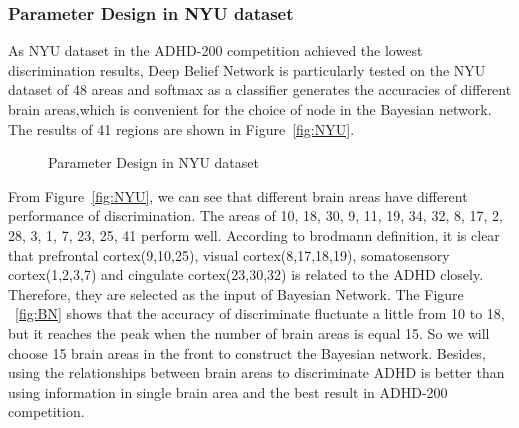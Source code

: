 \documentclass{article}
\begin{document}
\subsubsection{Parameter Design in NYU dataset}
As NYU dataset in the ADHD-200 competition achieved the lowest discrimination results, Deep Belief Network is particularly tested on the NYU dataset of 48 areas and softmax as a classifier generates the accuracies of different brain areas,which is convenient for the choice of node in the Bayesian network. The results of 41 regions are shown in Figure~\ref{fig:NYU}.
\begin{figure}[ht]
\begin{center}
   \caption{Parameter Design in NYU dataset}
\end{center}
\end{figure}


From Figure~\ref{fig:NYU}, we can see that different brain areas have different performance of discrimination. The areas of 10, 18, 30, 9, 11, 19, 34, 32, 8, 17, 2, 28, 3, 1, 7, 23, 25, 41 perform well. According to brodmann definition, it is clear that prefrontal cortex(9,10,25), visual cortex(8,17,18,19), somatosensory cortex(1,2,3,7) and cingulate cortex(23,30,32) is related to the ADHD closely. Therefore, they are selected as the input of Bayesian Network.  The Figure ~\ref{fig:BN} shows that the accuracy of discriminate fluctuate a little from 10 to 18, but it reaches the peak when the number of brain areas is equal 15. So we will choose 15 brain areas in the front to construct the Bayesian network. Besides, using the relationships between brain areas to discriminate ADHD is better than using information in single brain area and the best result in  ADHD-200 competition.
\end{document}
